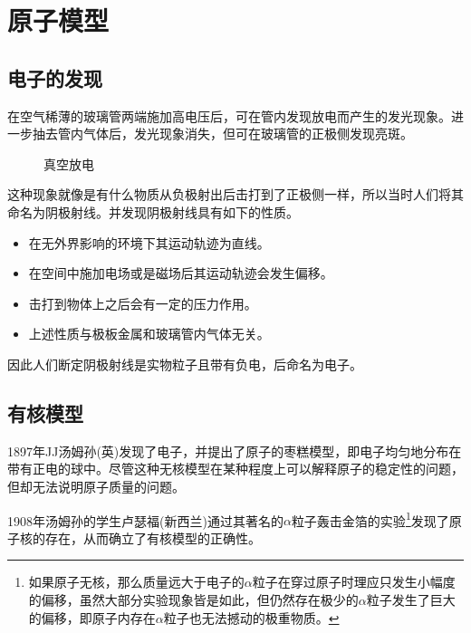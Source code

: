 
\section{原子模型}

\subsection{电子的发现}

在空气稀薄的玻璃管两端施加高电压后，可在管内发现放电而产生的发光现象。进一步抽去管内气体后，发光现象消失，但可在玻璃管的正极侧发现亮斑。
\begin{figure}[ht!]
    \centering
    \caption{真空放电}
\end{figure}
这种现象就像是有什么物质从负极射出后击打到了正极侧一样，所以当时人们将其命名为阴极射线。并发现阴极射线具有如下的性质。
\begin{itemize}
    \item 在无外界影响的环境下其运动轨迹为直线。
    \item 在空间中施加电场或是磁场后其运动轨迹会发生偏移。
    \item 击打到物体上之后会有一定的压力作用。
    \item 上述性质与极板金属和玻璃管内气体无关。
\end{itemize}
因此人们断定阴极射线是实物粒子且带有负电，后命名为电子。

\subsection{有核模型}

1897年JJ汤姆孙(英)发现了电子，并提出了原子的枣糕模型，即电子均匀地分布在带有正电的球中。尽管这种无核模型在某种程度上可以解释原子的稳定性的问题，但却无法说明原子质量的问题。

1908年汤姆孙的学生卢瑟福(新西兰)通过其著名的$\alpha$粒子轰击金箔的实验\footnote{如果原子无核，那么质量远大于电子的$\alpha$粒子在穿过原子时理应只发生小幅度的偏移，虽然大部分实验现象皆是如此，但仍然存在极少的$\alpha$粒子发生了巨大的偏移，即原子内存在$\alpha$粒子也无法撼动的极重物质。}发现了原子核的存在，从而确立了有核模型的正确性。

